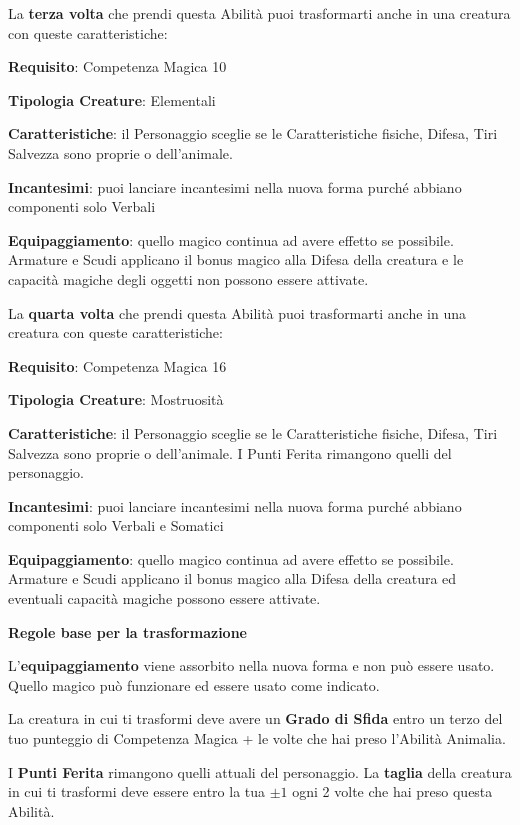 \begin{multicols}{2}
La \textbf{terza volta} che prendi questa Abilità puoi trasformarti anche in una creatura con queste caratteristiche:

\medskip

\textbf{Requisito}: Competenza Magica 10

\textbf{Tipologia Creature}: Elementali

\textbf{Caratteristiche}: il Personaggio sceglie se le Caratteristiche fisiche, Difesa, Tiri Salvezza sono proprie o dell'animale.

\textbf{Incantesimi}: puoi lanciare incantesimi nella nuova forma purché abbiano componenti solo Verbali

\textbf{Equipaggiamento}: quello magico continua ad avere effetto se possibile. Armature e Scudi applicano il bonus magico alla Difesa della creatura e le capacità magiche degli oggetti non possono essere attivate.

\medskip

La \textbf{quarta volta} che prendi questa Abilità puoi trasformarti anche in una creatura con queste caratteristiche:

\medskip

\textbf{Requisito}: Competenza Magica 16

\textbf{Tipologia Creature}: Mostruosità

\textbf{Caratteristiche}: il Personaggio sceglie se le Caratteristiche fisiche, Difesa, Tiri Salvezza sono proprie o dell'animale. I Punti Ferita rimangono quelli del personaggio.

\textbf{Incantesimi}: puoi lanciare incantesimi nella nuova forma purché abbiano componenti solo Verbali e Somatici

\textbf{Equipaggiamento}: quello magico continua ad avere effetto se possibile. Armature e Scudi applicano il bonus magico alla Difesa della creatura ed eventuali capacità magiche possono essere attivate.

\medskip

\textbf{Regole base per la trasformazione}

\medskip

L'\textbf{equipaggiamento} viene assorbito nella nuova forma e non può essere usato. Quello magico può funzionare ed essere usato come indicato.

La creatura in cui ti trasformi deve avere un \textbf{Grado di Sfida} entro un terzo del tuo punteggio di Competenza Magica + le volte che hai preso l'Abilità Animalia.

I \textbf{Punti Ferita} rimangono quelli attuali del personaggio. La \textbf{taglia} della creatura in cui ti trasformi deve essere entro la tua $\pm 1$ ogni 2 volte che hai preso questa Abilità.


\end{multicols}
